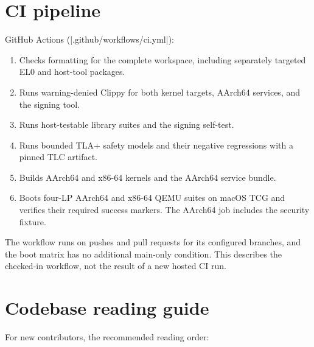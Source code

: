 \section{CI pipeline}

GitHub Actions (\repofile|.github/workflows/ci.yml|):

\begin{enumerate}
    \item Checks formatting for the complete workspace, including separately
        targeted EL0 and host-tool packages.
    \item Runs warning-denied Clippy for both kernel targets, AArch64 services,
        and the signing tool.
    \item Runs host-testable library suites and the signing self-test.
    \item Runs bounded TLA+ safety models and their negative regressions with
        a pinned TLC artifact.
    \item Builds AArch64 and x86-64 kernels and the AArch64 service bundle.
    \item Boots four-LP AArch64 and x86-64 QEMU suites on macOS TCG and verifies
        their required success markers. The AArch64 job includes the security
        fixture.
\end{enumerate}

The workflow runs on pushes and pull requests for its configured branches, and
the boot matrix has no additional main-only condition. This describes the checked-in
workflow, not the result of a new hosted CI run.

\section{Codebase reading guide}

For new contributors, the recommended reading order:


